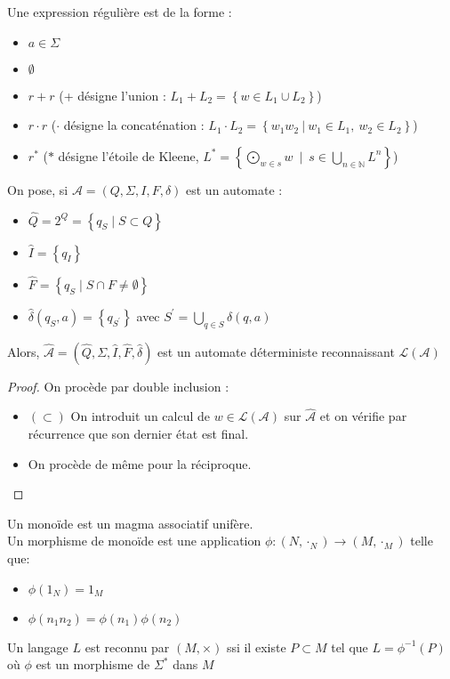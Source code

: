 \documentclass{cours}
\begin{document}
\begin{definition}
    Une expression régulière est de la forme : 
    \begin{itemize}
        \item $a \in \Sigma$ 
        \item $\emptyset$
        \item $r + r$ (+ désigne l'union : $L_1 + L_2 = \left\{w \in L_{1} \cup L_{2} \right\}$)
        \item $r \cdot r$ ($\cdot$ désigne la concaténation : $L_1 \cdot L_2 = \left\{w_{1}w_{2} \ | \ w_{1} \in L_{1}, \ w_{2} \in L_{2} \right\}$)
        \item $r^{*}$ ($*$ désigne l'étoile de Kleene, $L^{*} = \left\{ \bigodot\limits_{w \in s} w \ \mid \ s \in \bigcup\limits_{n \in \mathbb{N}} L^{n} \right\}$)
    \end{itemize}
\end{definition}

\begin{definition}
    On pose, si $\mathcal{A} = (Q, \Sigma, I, F, \delta)$ est un automate : 
    \begin{itemize}
        \item $\hat{Q} = 2^{Q} = \left\{q_{S} \mid S \subset Q\right\}$
        \item $\hat{I} = \left\{q_{I}\right\}$
        \item $\hat{F} = \left\{q_{S} \mid S \cap F \neq \emptyset \right\}$
        \item $\hat{\delta}(q_{S}, a) = \left\{q_{S^{'}}\right\}$ avec $S^{'} = \bigcup\limits_{q \in S}\delta(q, a)$
    \end{itemize}
    Alors, $\hat{\mathcal{A}} = (\hat{Q}, \Sigma, \hat{I}, \hat{F}, \hat{\delta})$ est un automate déterministe reconnaissant $\mathcal{L}(\mathcal{A})$
\end{definition}
\begin{proof}
    On procède par double inclusion :
    \begin{itemize}
        \item $(\subset)$ On introduit un calcul de $w \in \mathcal{L}(\mathcal{A})$ sur $\hat{\mathcal{A}}$ et on vérifie par récurrence que son dernier état est final.
        \item On procède de même pour la réciproque.
    \end{itemize}
\end{proof}

\begin{definition}
    Un monoïde est un magma associatif unifère. \\
    Un morphisme de monoïde est une application $\phi : (N, \cdot_{N}) \rightarrow (M, \cdot_{M})$ telle que: \begin{itemize}
        \item $\phi(1_{N}) = 1_{M}$
        \item $\phi(n_{1}n_{2}) = \phi(n_{1})\phi(n_{2})$
    \end{itemize}
    Un langage $L$ est reconnu par $(M, \times)$ ssi il existe $P \subset M$ tel que $L = \phi^{-1}(P)$ où $\phi$ est un morphisme de $\Sigma^{*}$ dans $M$
\end{definition}
\end{document}
